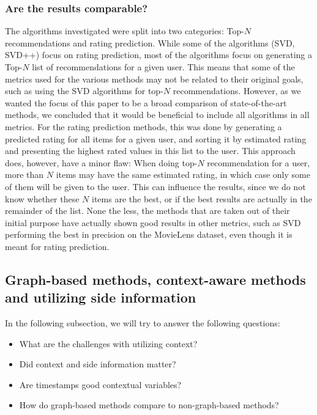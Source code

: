 \subsubsection{Are the results comparable?}
The algorithms investigated were split into two categories: Top-$N$ recommendations and rating prediction.
While some of the algorithms (SVD, SVD++) focus on rating prediction, most of the algorithms focus on generating a Top-$N$ list of recommendations for a given user.
This means that some of the metrics used for the various methods may not be related to their original goals, such as using the SVD algorithms for top-$N$ recommendations.
However, as we wanted the focus of this paper to be a broad comparison of state-of-the-art methods, we concluded that it would be beneficial to include all algorithms in all metrics.
For the rating prediction methods, this was done by generating a predicted rating for all items for a given user, and sorting it by estimated rating and presenting the highest rated values in this list to the user.
This approach does, however, have a minor flaw: When doing top-$N$ recommendation for a user, more than $N$ items may have the same estimated rating, in which case only some of them will be given to the user.
This can influence the results, since we do not know whether these $N$ items are the best, or if the best results are actually in the remainder of the list.
None the less, the methods that are taken out of their initial purpose have actually shown good results in other metrics, such as SVD performing the best in precision on the MovieLens dataset, even though it is meant for rating prediction.

\subsection{Graph-based methods, context-aware methods and utilizing side information}
In the following subsection, we will try to answer the following questions: 
\begin{itemize}
    \item What are the challenges with utilizing context?
    \item Did context and side information matter?
    \item Are timestamps good contextual variables?
    \item How do graph-based methods compare to non-graph-based methods?
\end{itemize}

